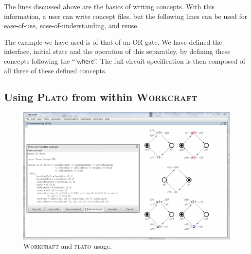 \documentclass[british,conference,compsoc]{IEEEtran}
\newcommand{\noun}[1]{\textsc{#1}}
\begin{document}
\vspace{-1mm}

The lines discussed above are the basics of writing concepts. With this 
information, a user can write concept files, but the following lines can be 
used for ease-of-use, ease-of-understanding, and reuse. 

The example we have used is of that of an OR-gate. We have defined the 
interface, initial state and the operation of this separatley, by defining 
these concepts following the ``'$\mathsf{where}$''. The full circuit 
specification is then composed of all three of these defined concepts. 

\subsection{Using \noun{Plato} from within \noun{Workcraft} \label{sec:workcraft_usage}}

\vspace{-2mm}

\begin{figure}[H]
\begin{centering}
\vspace{-3mm}
\includegraphics[scale=0.25]{Images/workcraft_design_flow.jpg}
\par\end{centering}

\begin{centering}
\protect\caption{\label{fig:design_flow_screenshot}\noun{Workcraft} and 
			\noun{plato} usage.}

\par\end{centering}
\vspace{-3mm}
\end{figure}
\end{document}
